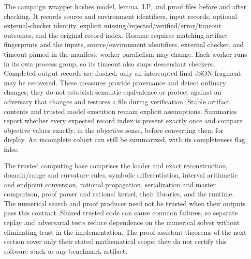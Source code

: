 The campaign wrapper hashes model, lemma, LP, and proof files before and after checking. It records source and environment identifiers, input records, optional external-checker identity, explicit missing/rejected/verified/error/timeout outcomes, and the original record index. Resume requires matching artifact fingerprints and the inputs, source/environment identifiers, external checker, and timeout pinned in the manifest; worker parallelism may change. Each worker runs in its own process group, so its timeout also stops descendant checkers. Completed output records are flushed; only an interrupted final JSON fragment may be recovered. These measures provide provenance and detect ordinary changes; they do not establish semantic equivalence or protect against an adversary that changes and restores a file during verification. Stable artifact contents and trusted model execution remain explicit assumptions. Summaries report whether every expected record index is present exactly once and compare objective values exactly, in the objective sense, before converting them for display. An incomplete cohort can still be summarized, with its completeness flag false.

The trusted computing base comprises the loader and exact reconstruction, domain/range and curvature rules, symbolic differentiation, interval arithmetic and endpoint conversion, rational propagation, serialization and master comparison, proof parser and rational kernel, their libraries, and the runtime. The numerical search and proof producer need not be trusted when their outputs pass this contract. Shared trusted code can cause common failures, so separate replay and adversarial tests reduce dependence on the numerical solver without eliminating trust in the implementation. The proof-assistant theorems of the next section cover only their stated mathematical scope; they do not certify this software stack or any benchmark artifact.
